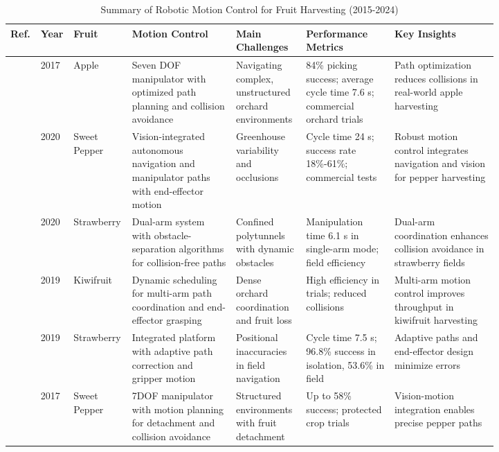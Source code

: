 \documentclass[a4paper,fleqn]{cas-dc}
\begin{document}
\begin{table}[htbp]
\centering
\footnotesize
\caption{Summary of Robotic Motion Control for Fruit Harvesting (2015-2024)}
\label{tab:motion-control-based}
\begin{tabular}{p{0.025\linewidth} p{0.025\linewidth} p{0.055\linewidth} p{0.2\linewidth} p{0.135\linewidth} p{0.175\linewidth} p{0.2\linewidth}}
\toprule
\textbf{Ref.} & \textbf{Year} & \textbf{Fruit} & \textbf{Motion Control} & \textbf{Main Challenges} & \textbf{Performance Metrics} & \textbf{Key Insights} \\ \midrule
\cite{silwal2017design} & 2017 & Apple & Seven DOF manipulator with optimized path planning and collision avoidance & Navigating complex, unstructured orchard environments & 84\% picking success; average cycle time 7.6 s; commercial orchard trials & Path optimization reduces collisions in real-world apple harvesting \\ \midrule
\cite{arad2020development} & 2020 & Sweet Pepper & Vision-integrated autonomous navigation and manipulator paths with end-effector motion & Greenhouse variability and occlusions & Cycle time 24 s; success rate 18\%-61\%; commercial tests & Robust motion control integrates navigation and vision for pepper harvesting \\ \midrule
\cite{xiong2020autonomous} & 2020 & Strawberry & Dual-arm system with obstacle-separation algorithms for collision-free paths & Confined polytunnels with dynamic obstacles & Manipulation time 6.1 s in single-arm mode; field efficiency & Dual-arm coordination enhances collision avoidance in strawberry fields \\ \midrule
\cite{williams2019robotic} & 2019 & Kiwifruit & Dynamic scheduling for multi-arm path coordination and end-effector grasping & Dense orchard coordination and fruit loss & High efficiency in trials; reduced collisions & Multi-arm motion control improves throughput in kiwifruit harvesting \\ \midrule
\cite{xiong2019development} & 2019 & Strawberry & Integrated platform with adaptive path correction and gripper motion & Positional inaccuracies in field navigation & Cycle time 7.5 s; 96.8\% success in isolation, 53.6\% in field & Adaptive paths and end-effector design minimize errors \\ \midrule
\cite{lehnert2017autonomous} & 2017 & Sweet Pepper & 7DOF manipulator with motion planning for detachment and collision avoidance & Structured environments with fruit detachment & Up to 58\% success; protected crop trials & Vision-motion integration enables precise pepper paths \\ \midrule

\end{tabular}
\end{table}
\end{document}
